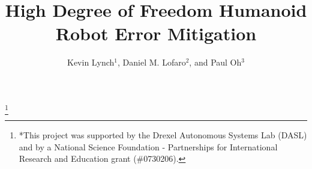 \documentclass[fleqn,10pt,twocolumn]{ICCAS2012}
\begin{document}
\title{High Degree of Freedom Humanoid Robot Error Mitigation}

\author{Kevin Lynch${}^{1}$, Daniel M. Lofaro${}^{2}$, and Paul Oh${}^{3}$ }

\thanks{*This project was supported by the Drexel Autonomous Systems Lab (DASL) and by a National Science Foundation - Partnerships for International Research and Education grant (\#0730206).}%
\abstract{

}


\maketitle










%


%
%


%
{}



%
\end{document}
